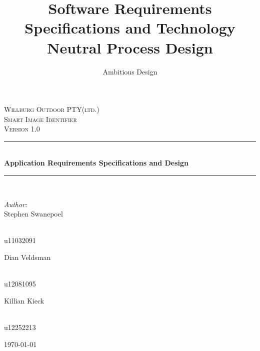 \documentclass[a4paper,12pt]{report}
\author{Ambitious Design}
\title{ Software Requirements Specifications and Technology Neutral Process Design}
\newcommand{\HRule}{\rule{\linewidth}{0.5mm}}
\begin{document}
\setlength{\parskip}{6pt}

\begin{titlepage}

\begin{center}
\textsc{\LARGE Willburg Outdoor PTY(ltd.)}\\[1.5cm]
\textsc{\Large Smart Image Identifier }\\[1.0cm]
\textsc{\Large Version 1.0 }\\[0.5cm]
\HRule \\[0.4cm]
{ \huge \bfseries  Application Requirements Specifications and Design}\\[0.4cm]
\HRule \\[0.4cm]
\begin{minipage}{0.4\textwidth}
\begin{flushleft} \large
\emph{Author:}\\
Stephen {Swanepoel}
\end{flushleft}
\end{minipage}
\begin{minipage}{0.4\textwidth}
\begin{flushright} \large
\emph{} \\
u11032091
\end{flushright}
\end{minipage}
\begin{minipage}{0.4\textwidth}
\begin{flushleft} \large
Dian {Veldsman}
\end{flushleft}
\end{minipage}
\begin{minipage}{0.4\textwidth}
\begin{flushright} \large
\emph{} \\
u12081095
\end{flushright}
\end{minipage}
\begin{minipage}{0.4\textwidth}
\begin{flushleft} \large
Killian {Kieck}
\end{flushleft}
\end{minipage}
\begin{minipage}{0.4\textwidth}
\begin{flushright} \large
\emph{} \\
u12252213
\end{flushright}
\end{minipage}


{\large \today}
\end{center}
\end{titlepage}
\footnotesize
\normalsize
\end{document}
